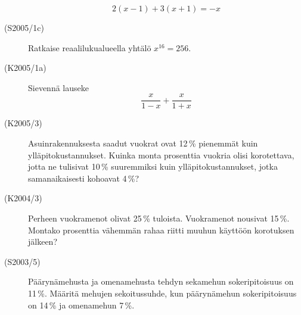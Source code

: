 \begin{description}
                        \[ 2(x - 1) + 3(x + 1 ) = -x \]
    \item[(S2005/1c)]  Ratkaise reaalilukualueella yhtälö $ x^{16} = 256 $.
    \item[(K2005/1a)]  Sievennä lauseke
                        \[ \frac{x}{1 - x} + \frac{x}{1 + x} \]
    \item[(K2005/3)]   Asuinrakennuksesta saadut vuokrat ovat 12\,\% pienemmät kuin
                        ylläpitokustannukset. Kuinka monta prosenttia vuokria olisi
                        korotettava, jotta ne tulisivat 10\,\% suuremmiksi kuin 
                        ylläpitokustannukset, jotka samanaikaisesti kohoavat 4\,\%?
    \item[(K2004/3)]   Perheen vuokramenot olivat 25\,\% tuloista. Vuokramenot nousivat
                        15\,\%. Montako prosenttia vähemmän rahaa riitti muuhun
                        käyttöön korotuksen jälkeen?
    \item[(S2003/5)]   Päärynämehusta ja omenamehusta tehdyn sekamehun sokeripitoisuus
                        on 11\,\%. Määritä mehujen sekoitussuhde, kun päärynämehun
                        sokeripitoisuus on 14\,\% ja omenamehun 7\,\%.


\end{description}
